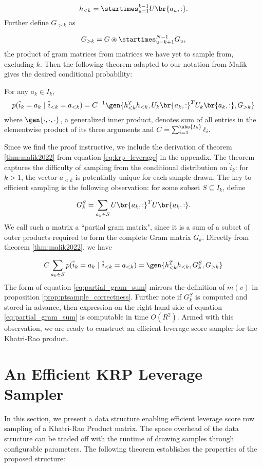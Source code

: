 $$h_{< k} = \startimes_{u=1}^{k-1} U \br{a_u, :}.$$
Further define $G_{> k}$ as 

$$G_{> k} = G \circledast \startimes_{u=k+1}^{N-1} G_u,$$
the product of gram matrices from matrices we have yet to sample from,
excluding $k$. Then the following theorem adapted to our notation from 
Malik \cite{malik2022} gives the desired conditional probability:

\begin{theorem}
For any $a_k \in I_k$,
$$p(\hat i_k = a_k\ \vert\ \hat i_{< k} = a_{< k}) = 
C^{-1} \gen{h_{<k}^T h_{<k}, U_k\br{a_k, :}^T U_k \br{a_k, :}, G_{> k}}
$$
where $\gen{\cdot, \cdot, \cdot}$, a generalized inner product, 
denotes sum of all entries in the elementwise product of 
its three arguments and $C = \sum_{i=1}^{\abs{I_k}} \ell_i.$
\label{thm:malik2022}
\end{theorem}
Since we find the proof instructive, we include the derivation of
theorem \ref{thm:malik2022} from equation 
\ref{eq:krp_leverage} in the appendix. The theorem captures 
the difficulty of sampling from the conditional distribution on 
$\hat i_k$: for $k > 1$, the vector $a_{<k}$ is potentially 
unique for each sample drawn. The key to efficient sampling is 
the following observation: for some subset $S \subseteq I_k$, define 

\begin{equation}
G^S_k = \sum_{a_k \in S} U \br{a_k, :}^T U\br{a_k, :}.
\label{eq:partial_gram}
\end{equation}
We call such a matrix a ``partial gram matrix", since it is a sum
of a subset of outer products required to form the complete Gram
matrix $G_k$. Directly from theorem \ref{thm:malik2022}, we have 

\begin{equation} 
C \sum_{a_k \in S} p(\hat i_k = a_k\ \vert\ \hat i_{< k} = a_{< k}) = 
\gen{h_{<k}^T h_{<k}, G^S_k, G_{> k}}
\label{eq:partial_gram_sum}
\end{equation}
The form of equation \ref{eq:partial_gram_sum} mirrors the definition 
of $m(v)$ in proposition \ref{prop:ptsample_correctness}. Further 
note if $G_k^S$ is computed and stored in advance, then
expression on the right-hand side of equation \ref{eq:partial_gram_sum}
is computable in time $O(R^2)$. Armed with this observation, we are
ready to construct an efficient leverage score sampler for the
Khatri-Rao product.

\section{An Efficient KRP Leverage Sampler}
In this section, we present a data structure enabling efficient 
leverage score row sampling of a Khatri-Rao Product matrix. The space overhead of the data structure can be traded off with the runtime of 
drawing samples through configurable parameters. The following
theorem establishes the properties of the proposed structure:

